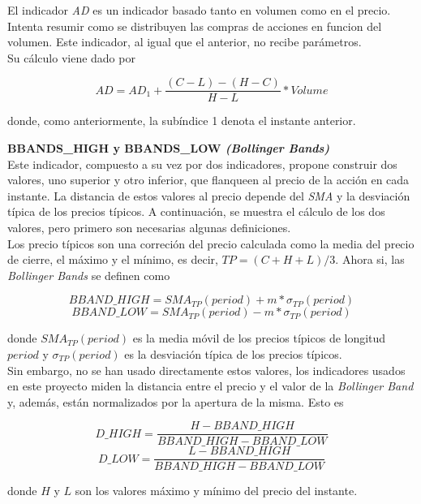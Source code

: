 \begin{appendices}
El indicador \textit{AD} es un indicador basado tanto en volumen como en el precio. Intenta resumir como se distribuyen las compras de acciones en funcion del volumen. Este indicador, al igual que el anterior, no recibe par\'ametros.\\

Su c\'alculo viene dado por

\[AD = AD_{1} + \frac{(C - L) - (H - C)}{H - L}*Volume \]

donde, como anteriormente, la sub\'indice 1 denota el instante anterior.

\vspace{0.5cm}
\noindent\textbf{BBANDS\_HIGH y BBANDS\_LOW \textit{(Bollinger Bands)}}\\

Este indicador, compuesto a su vez por dos indicadores, propone construir dos valores, uno superior y otro inferior, que flanqueen al precio de la acci\'on en cada instante. La distancia de estos valores al precio depende del \textit{SMA} y la desviaci\'on t\'ipica de los precios t\'ipicos. A continuaci\'on, se muestra el c\'alculo de los dos valores, pero primero son necesarias algunas definiciones.\\

Los precio t\'ipicos son una correci\'on del precio calculada como la media del precio de cierre, el m\'aximo y el m\'inimo, es decir, $TP = (C + H + L) / 3$. Ahora si, las \textit{Bollinger Bands} se definen como

\[BBAND\_HIGH = SMA_{TP}(period) + m*\sigma_{TP}(period)\] 
\[BBAND\_LOW = SMA_{TP}(period) - m*\sigma_{TP}(period)\] 

donde $SMA_{TP}(period)$ es la media m\'ovil de los precios t\'ipicos de longitud $period$ y $\sigma_{TP}(period)$ es la desviaci\'on t\'ipica de los precios t\'ipicos.\\

Sin embargo, no se han usado directamente estos valores, los indicadores usados en este proyecto miden la distancia entre el precio y el valor de la \textit{Bollinger Band} y, adem\'as, est\'an normalizados por la apertura de la misma. Esto es

\[D\_HIGH = \frac{H - BBAND\_HIGH}{ BBAND\_HIGH - BBAND\_LOW}\] 
\[D\_LOW =  \frac{L - BBAND\_HIGH}{ BBAND\_HIGH - BBAND\_LOW}\]

donde $H$ y $L$ son los valores m\'aximo y m\'inimo del precio del instante.

\end{appendices}
